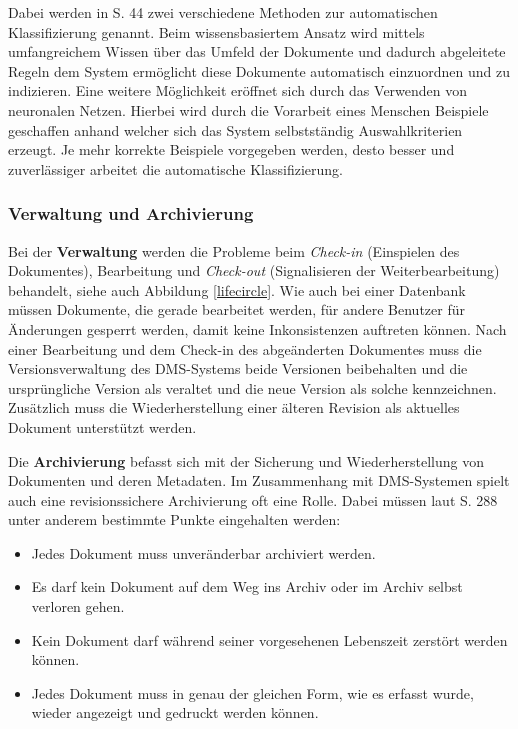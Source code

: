 Dabei werden in \cite{DMS08} S. 44 zwei verschiedene Methoden zur automatischen Klassifizierung genannt.
Beim wissensbasiertem Ansatz wird mittels umfangreichem Wissen über das Umfeld der Dokumente und dadurch abgeleitete Regeln dem System ermöglicht diese Dokumente automatisch einzuordnen und zu indizieren.
Eine weitere Möglichkeit eröffnet sich durch das Verwenden von neuronalen Netzen.
Hierbei wird durch die Vorarbeit eines Menschen Beispiele geschaffen anhand welcher sich das System selbstständig Auswahlkriterien erzeugt.
Je mehr korrekte Beispiele vorgegeben werden, desto besser und zuverlässiger arbeitet die automatische Klassifizierung.

\subsubsection{Verwaltung und Archivierung}
Bei der \textbf{Verwaltung} werden die Probleme beim \textit{Check-in} (Einspielen des Dokumentes), Bearbeitung und \textit{Check-out} (Signalisieren der Weiterbearbeitung) behandelt, siehe auch Abbildung \ref{lifecircle}.
Wie auch bei einer Datenbank müssen Dokumente, die gerade bearbeitet werden, für andere Benutzer für Änderungen gesperrt werden, damit keine Inkonsistenzen auftreten können.
Nach einer Bearbeitung und dem Check-in des abgeänderten Dokumentes muss die Versionsverwaltung des \gls{DMS}-Systems beide Versionen beibehalten und die ursprüngliche Version als veraltet und die neue Version als solche kennzeichnen.
Zusätzlich muss die Wiederherstellung einer älteren Revision als aktuelles Dokument unterstützt werden.


Die \textbf{Archivierung} befasst sich mit der Sicherung und Wiederherstellung von Dokumenten und deren Metadaten.
Im Zusammenhang mit \gls{DMS}-Systemen spielt auch eine revisionssichere Archivierung oft eine Rolle.
Dabei müssen laut \cite{DMS08} S. 288 unter anderem bestimmte Punkte eingehalten werden:

\begin{itemize}
\item Jedes Dokument muss unveränderbar archiviert werden.
\item Es darf kein Dokument auf dem Weg ins Archiv oder im Archiv selbst verloren gehen.
\item Kein Dokument darf während seiner vorgesehenen Lebenszeit zerstört werden können.
\item Jedes Dokument muss in genau der gleichen Form, wie es erfasst wurde, wieder angezeigt und gedruckt werden können.
\end{itemize}

